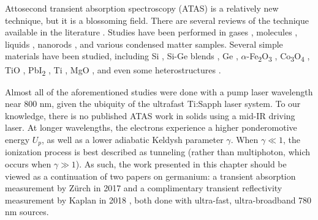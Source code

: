 Attosecond transient absorption spectroscopy (ATAS) is a relatively new technique, but it is a blossoming field. There are several reviews of the technique available in the literature \cite{beckProbingUltrafastDynamics2015,leoneWhatWillIt2014,changAttosecondOpticsTechnology2016,ramaseshaRealTimeProbingElectron2016,geneauxTransientAbsorptionSpectroscopy2019}. Studies have been performed in gases \cite{goulielmakisRealtimeObservationValence2010,wangAttosecondTimeResolvedAutoionization2010,caoAttosecondTransientAbsorption2016,chewAttosecondTransientAbsorption2018,chenLightinducedStatesAttosecond2012,bellIntensityDependenceLightinduced2013,linStrongfieldInducedXUV2012,bernhardtHighspectralresolutionAttosecondAbsorption2014,liInvestigationCouplingMechanisms2015,beckAttosecondTransientAbsorption2014}, molecules \cite{hoslerCharacterizationVibrationalWave2013,attarCoretovalenceSpectroscopicDetection2014,warrickProbingDynamicsRydberg2016}, liquids \cite{ziemkiewiczFemtosecondTimeresolvedXUV2014}, nanorods \cite{porterPhotoexcitedSmallPolaron2018}, and various condensed matter samples. Several simple materials have been studied, including Si \cite{schultzeAttosecondBandgapDynamics2014,cushingDifferentiatingPhotoexcitedCarrier2019}, Si-Ge blends \cite{zurchUltrafastCarrierThermalization2017}, Ge \cite{zurchDirectSimultaneousObservation2017,kaplanFemtosecondTrackingCarrier2018}, $\alpha$-Fe\textsubscript{2}O\textsubscript{3} \cite{vura-weisFemtosecondEdgeSpectroscopy2013}, Co\textsubscript{3}O\textsubscript{4} \cite{jiangCharacterizationPhotoInducedCharge2014}, TiO \cite{vaidaFemtosecondExtremeUltraviolet2016}, PbI\textsubscript{2} \cite{linCarrierSpecificFemtosecondXUV2017}, Ti \cite{volkovAttosecondScreeningDynamics2019}, MgO \cite{geneauxAttosecondTimeDomainMeasurement2020}, and even some heterostructures \cite{marshUltrafastTimeresolvedExtreme2018,cushingLayerresolvedUltrafastExtreme2020}.

Almost all of the aforementioned studies were done with a pump laser wavelength near 800 nm, given the ubiquity of the ultrafast Ti:Sapph laser system. To our knowledge, there is no published ATAS work in solids using a mid-IR driving laser. At longer wavelengths, the electrons experience a higher ponderomotive energy $U_p$, as well as a lower adiabatic Keldysh parameter $\gamma$. When $\gamma \ll 1$, the ionization process is best described as tunneling (rather than multiphoton, which occurs when $\gamma \gg 1$). As such, the work presented in this chapter should be viewed as a continuation of two papers on germanium: a transient absorption measurement by Z\"{u}rch in 2017 \cite{zurchDirectSimultaneousObservation2017} and a complimentary transient reflectivity measurement by Kaplan in 2018 \cite{kaplanFemtosecondTrackingCarrier2018}, both done with ultra-fast, ultra-broadband 780 nm sources.

